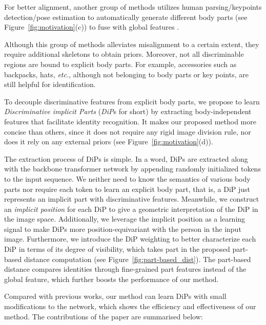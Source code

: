 \documentclass[10pt,twocolumn,letterpaper]{article}
\begin{document}
For better alignment, another group of methods utilizes human parsing/keypoints detection/pose estimation to automatically generate different body parts (see Figure~\ref{fig:motivation}(c)) to fuse with global features \cite{suh2018part, zhao2017deeply, cheng2016person, zhao2017spindle, li2017learning}. 

Although this group of methods alleviates misalignment to a certain extent, they require additional skeletons to obtain priors. Moreover, not all discriminable regions are bound to explicit body parts. For example, accessories such as backpacks, hats, \textit{etc.}, although not belonging to body parts or key points, are still helpful for identification.

\vspace{0.2cm}
To decouple discriminative features from explicit body parts, we propose to learn \textit{Discriminative implicit Parts} (\textit{DiP}s for short) by extracting body-independent features that facilitate identity recognition. It makes our proposed method more concise than others, since it does not require any rigid image division rule, nor does it rely on any external priors (see Figure~\ref{fig:motivation}(d)). 

\vspace{0.2cm}
The extraction process of DiPs is simple. In a word, DiPs are extracted along with the backbone transformer network by appending randomly initialized tokens to the input sequence. We neither need to know the semantics of various body parts nor require each token to learn an explicit body part, that is, a DiP just represents an implicit part with discriminative features. Meanwhile, we construct an \textit{implicit position} for each DiP to give a geometric interpretation of the DiP in the image space. Additionally, we leverage the implicit position as a learning signal to make DiPs more position-equivariant with the person in the input image. Furthermore, we introduce the DiP weighting to better characterize each DiP in terms of its degree of visibility, which takes part in the proposed part-based distance computation (see Figure~\ref{fig:part-based_dist}). The part-based distance compares identities through fine-grained part features instead of the global feature, which further boosts the performance of our method.

\vspace{0.2cm}
Compared with previous works, our method can learn DiPs with small modifications to the network, which shows the efficiency and effectiveness of our method. The contributions of the paper are summarised below:
\end{document}

